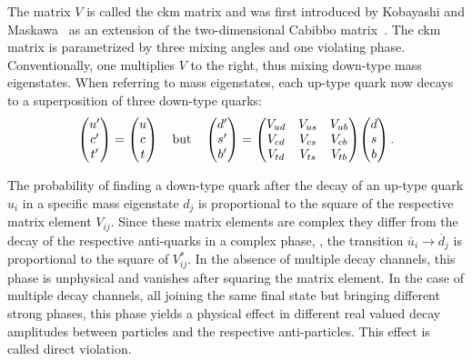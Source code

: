 The matrix $V$ is called the \gls{ckm} matrix and was first introduced by Kobayashi and Maskawa~\cite{Kobayashi1973} as an extension of the two-dimensional Cabibbo matrix~\cite{Cabibbo1963}.
The \gls{ckm} matrix is parametrized by three mixing angles and one \CP violating phase.
Conventionally, one multiplies $V$ to the right, thus mixing down-type mass eigenstates.
When referring to mass eigenstates, each up-type quark now decays to a superposition of three down-type quarks:
\begin{equation*}
    \begin{pmatrix} {\ensuremath{u}}' \\ {c}' \\ {t}' \end{pmatrix} = \begin{pmatrix} {\ensuremath{u}} \\ {c} \\ {t} \end{pmatrix} \quad \text{but} \quad
    \begin{pmatrix} {\ensuremath{d}}' \\ {s}' \\ {b}' \end{pmatrix} = \begin{pmatrix} {\ensuremath{V_{{u}{d}}}} & {V_{{u}{s}}} & {V_{{u}{b}}} \\ {V_{{c}{d}}} & {V_{{c}{s}}} & {V_{{c}{b}}} \\ {V_{{t}{d}}} & {V_{{t}{s}}} & {V_{{t}{b}}} \end{pmatrix} \! \begin{pmatrix} {\ensuremath{d}} \\ {s} \\ {b} \end{pmatrix}.
\end{equation*}

The probability of finding a down-type quark after the decay of an up-type quark $u_i$ in a specific mass eigenstate $d_j$ is proportional to the square of the respective matrix element $V_{ij}$.
Since these matrix elements are complex they differ from the decay of the respective anti-quarks in a complex phase, \ie{}, the transition $\overline{u}_i \to \overline{d}_j$ is proportional to the square of $V^*_{ij}$.
In the absence of multiple decay channels, this phase is unphysical and vanishes after squaring the matrix element. 
In the case of multiple decay channels, all joining the same final state but bringing different strong phases, this phase yields a physical effect in different real valued decay amplitudes between particles and the respective anti-particles.
This effect is called direct \CP violation.

